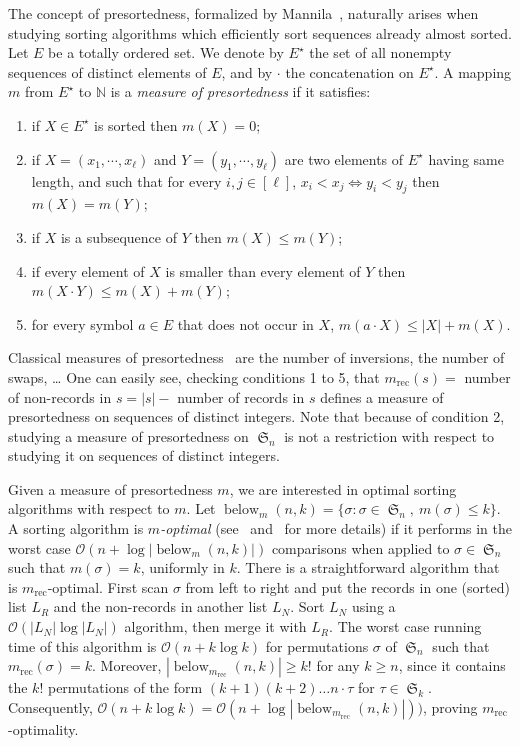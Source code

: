 \documentclass[proceedings]{aofa}
\renewcommand{\O}{\mathcal{O}}
\DeclareMathOperator{\sym}{\mathfrak{S}}
\DeclareMathOperator{\below}{below}
\begin{document}
The concept of presortedness, formalized by Mannila~\cite{Mannila1985}, naturally arises when studying sorting algorithms which efficiently sort sequences already almost sorted. 
Let $E$ be a totally ordered set. 
We denote by $E^{\star}$ the set of all nonempty sequences of distinct elements of $E$, 
and by $\cdot$ the concatenation on $E^{\star}$. 
A mapping $m$ from  $E^{\star}$ to $\mathbb N$ is a \emph{measure of presortedness} if it satisfies:
\begin{enumerate}
\setlength\itemsep{-1mm}
\item if $X\in E^{\star}$ is sorted then $m(X)=0$;
\item if $X=(x_{1},\cdots,x_{\ell})$ and $Y=(y_{1},\cdots,y_{\ell})$ are two elements of $E^{\star}$ having same length, and such that for every $i,j\in[\ell]$,
$x_{i}<x_{j}\Leftrightarrow y_{i}<y_{j}$ then $m(X)=m(Y)$;
\item if $X$ is a subsequence of $Y$ then $m(X)\leq m(Y)$;
\item if every element of $X$ is smaller than every element of $Y$ then $m(X\cdot Y)\leq m(X) + m(Y)$;
\item for every symbol $a\in E$ that does not occur in $X$, $m(a\cdot X)\leq |X|+m(X)$.
\end{enumerate}
Classical measures of presortedness~\cite{Mannila1985} are the number of inversions, the number of swaps, \ldots 
One can easily see, checking conditions 1 to 5, that $m_{\text{rec}}(s) =$ number of non-records in $s = |s| -$ number of records in $s$ 
defines a measure of presortedness on sequences of distinct integers. 
Note that because of condition 2, studying a measure of presortedness on $\sym_n$ is not a restriction with respect to studying it on sequences of distinct integers. 

Given a measure of presortedness $m$, we are interested in optimal sorting algorithms with respect to $m$. 
Let $\below_m(n,k)=\{\sigma:\sigma\in\sym_{n},\ m(\sigma)\leq k\}$. 
A sorting algorithm is \emph{$m$-optimal} (see~\cite{Mannila1985} and~\cite{Petersson95} for more details) 
if it performs in the worst case $\O(n+\log|\below_m(n,k)|)$ comparisons when applied to $\sigma \in \sym_n$ such that $m(\sigma)=k$, uniformly in $k$. 
There is a straightforward algorithm  that is $m_{\text{rec}}$-optimal. First scan $\sigma$ from left to right and put the records in one (sorted) list $L_{R}$ and the non-records in another list $L_{N}$. Sort $L_{N}$ using a $\O(|L_{N}|\log |L_{N}|)$ algorithm, then merge it with
$L_{R}$. The worst case running time of this algorithm is $\O(n+k\log k)$ for 
permutations $\sigma$ of $\sym_{n}$ such that $m_{\text{rec}}(\sigma)=k$.
Moreover, $|\below_{m_{\text{rec}}}(n,k)| \geq k!$ for any $k \geq n$, 
since it contains the $k!$ permutations of the form $(k+1) (k+2)\ldots n \cdot \tau$ for $\tau\in\sym_{k}$. 
Consequently, $\O(n+k\log k) = \O(n+\log|\below_{m_{\text{rec}}}(n,k)|))$, proving $m_{\text{rec}}$-optimality. 
\end{document}
